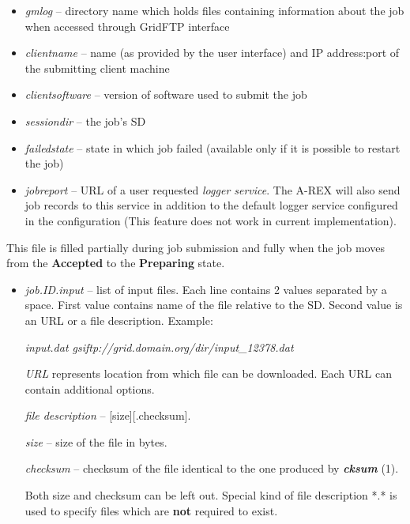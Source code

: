 \documentclass{article}                            %
\begin{document}
\begin{itemize}
\begin{itemize}
\item \textit{gmlog} -- directory name which holds files containing information
about the job when accessed through GridFTP interface
\item \textit{clientname} -- name (as provided by the user interface) and
IP address:port of the submitting client machine
\item \textit{clientsoftware} -- version of software used to submit the job
\item \textit{sessiondir} -- the job's SD
\item \textit{failedstate} -- state in which job failed (available only if
it is possible to restart the job)
\item \textit{jobreport} -- URL of a user requested \emph{logger service}.
The A-REX will also send job records to this service in addition to
the default logger service configured in the configuration (This feature
does not work in current implementation).
\end{itemize}
\end{itemize}

This file is filled partially during job submission and fully when
the job moves from the \textbf{Accepted} to the \textbf{Preparing}
state.

\begin{itemize}
\item \textit{job.ID.input} -- list of input files. Each line contains 2
values separated by a space. First value contains name of the file
relative to the SD. Second value is an URL or a file description.
Example:


\hspace*{1cm}\textit{input.dat gsiftp://grid.domain.org/dir/input\_12378.dat}

\emph{URL} represents location from which file can be downloaded.
Each URL can contain additional options.

\textit{file description} -- {[}size]{[}.checksum].

\hspace*{1cm}\textit{size} -- size of the file in bytes.

\hspace*{1cm}\textit{checksum} -- checksum of the file identical to
the one produced by \textbf{\textit{cksum}} (1).

Both size and checksum can be left out. Special kind of file description
{*}.{*} is used to specify files which are \textbf{not} required to
exist.
\end{itemize}
\end{document}
